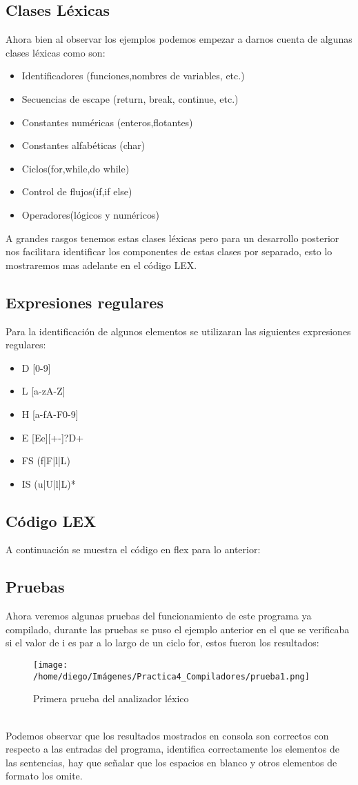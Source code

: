 \documentclass{article}
\begin{document}
		\subsection{Clases Léxicas}
			Ahora bien al observar los ejemplos podemos empezar a darnos cuenta de algunas clases léxicas como son:
			\begin{itemize}
				\item Identificadores (funciones,nombres de variables, etc.)
				\item Secuencias de escape (return, break, continue, etc.)
				\item Constantes numéricas (enteros,flotantes)
				\item Constantes alfabéticas (char)
				\item Ciclos(for,while,do while)
				\item Control de flujos(if,if else)
				\item Operadores(lógicos y numéricos)
			\end{itemize}
			A grandes rasgos tenemos estas clases léxicas pero para un desarrollo posterior nos facilitara identificar los componentes de estas clases por separado, esto lo mostraremos mas adelante en el código LEX.
		\subsection{Expresiones regulares}
			Para la identificación de algunos elementos se utilizaran las siguientes expresiones regulares:
			\begin{itemize}
				\item D [0-9]
				\item L [a-zA-Z]
				\item H [a-fA-F0-9]
				\item E [Ee][+-]?{D}+
				\item FS (f|F|l|L)
				\item IS (u|U|l|L)*
			\end{itemize}
		\subsection{Código LEX}
			A continuación se muestra el código en flex para lo anterior:
			
		\subsection{Pruebas}
			Ahora veremos algunas pruebas del funcionamiento de este programa ya compilado, durante las pruebas se puso el ejemplo anterior en el que se verificaba si el valor de i es par a lo largo de un ciclo for, estos fueron los resultados:
			\begin{figure}[h]
				\centering
				\texttt{[image: /home/diego/Imágenes/Practica4\_Compiladores/prueba1.png]}
				\caption{Primera prueba del analizador léxico}
			\end{figure}
			\\Podemos observar que los resultados mostrados en consola son correctos con respecto a las entradas del programa, identifica correctamente los elementos de las sentencias, hay que señalar que los espacios en blanco y otros elementos de formato los omite.
\end{document}

